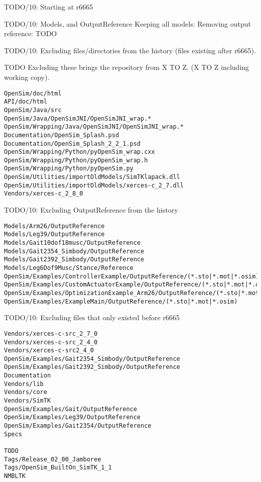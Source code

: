 \documentclass[pdf, 8pt]{beamer}
\def\NUMDECISIONS{10}
\begin{document}
\begin{frame}{TODO/\NUMDECISIONS: Starting at r6665}
\end{frame}

\begin{frame}{TODO/\NUMDECISIONS: Models, and OutputReference}
Keeping all models:
Removing output reference:
TODO
\end{frame}

\begin{frame}[fragile]{TODO/\NUMDECISIONS: Excluding files/directories from the
history (files existing after r6665).}

TODO Excluding these brings the repository from X TO Z. (X TO Z including
working copy).
\begin{Verbatim}
OpenSim/doc/html
API/doc/html
OpenSim/Java/src
OpenSim/Java/OpenSimJNI/OpenSimJNI_wrap.*
OpenSim/Wrapping/Java/OpenSimJNI/OpenSimJNI_wrap.*
Documentation/OpenSim_Splash.psd
Documentation/OpenSim_Splash_2_2_1.psd
OpenSim/Wrapping/Python/pyOpenSim_wrap.cxx
OpenSim/Wrapping/Python/pyOpenSim_wrap.h
OpenSim/Wrapping/Python/pyOpenSim.py
OpenSim/Utilities/importOldModels/SimTKlapack.dll
OpenSim/Utilities/importOldModels/xerces-c_2_7.dll
Vendors/xerces-c_2_8_0
\end{Verbatim}

\end{frame}

\begin{frame}[fragile]{TODO/\NUMDECISIONS: Excluding OutputReference from the history}

\begin{Verbatim}
Models/Arm26/OutputReference
Models/Leg39/OutputReference
Models/Gait10dof18musc/OutputReference
Models/Gait2354_Simbody/OutputReference
Models/Gait2392_Simbody/OutputReference
Models/Leg6Dof9Musc/Stance/Reference
OpenSim/Examples/ControllerExample/OutputReference/(*.sto|*.mot|*.osim)
OpenSim/Examples/CustomActuatorExample/OutputReference/(*.sto|*.mot|*.osim)
OpenSim/Examples/OptimizationExample_Arm26/OutputReference/(*.sto|*.mot|*.osim)
OpenSim/Examples/ExampleMain/OutputReference/(*.sto|*.mot|*.osim)
\end{Verbatim}

\end{frame}

\begin{frame}[fragile]{TODO/\NUMDECISIONS: Excluding files that only existed
before r6665}

\begin{Verbatim}
Vendors/xerces-c-src_2_7_0
Vendors/xerces-c-src_2_4_0
Vendors/xerces-c-src2_4_0
OpenSim/Examples/Gait2354_Simbody/OutputReference
OpenSim/Examples/Gait2392_Simbody/OutputReference
Documentation
Vendors/lib
Vendors/core
Vendors/SimTK
OpenSim/Examples/Gait/OutputReference
OpenSim/Examples/Leg39/OutputReference
OpenSim/Examples/Gait2354/OutputReference
Specs

TODO
Tags/Release_02_00_Jamboree
Tags/OpenSim_BuiltOn_SimTK_1_1
NMBLTK
\end{Verbatim}

\end{frame}
\end{document}
